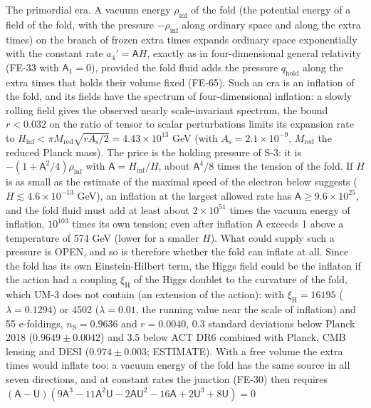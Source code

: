 \documentclass[
  10pt,
]{article}
\begin{document}
The primordial era. A vacuum energy \(\rho_{\mathrm{inf}}\) of the fold
(the potential energy of a field of the fold, with the pressure
\(-\rho_{\mathrm{inf}}\) along ordinary space and along the extra times)
on the branch of frozen extra times expands ordinary space exponentially
with the constant rate \(a_4' = \mathsf{A}H\), exactly as in
four-dimensional general relativity (FE-33 with \(\mathsf{A}_1 = 0\)),
provided the fold fluid adds the pressure \(q_{\mathrm{hold}}\) along
the extra times that holds their volume fixed (FE-65). Such an era is an
inflation of the fold, and its fields have the spectrum of
four-dimensional inflation: a slowly rolling field gives the observed
nearly scale-invariant spectrum, the bound \(r < 0.032\) on the ratio of
tensor to scalar perturbations limits its expansion rate to
\(H_{\mathrm{inf}} < \pi M_{\mathrm{red}}\sqrt{rA_{\mathrm{s}}/2} = 4.43\times10^{13}\)
GeV (with \(A_{\mathrm{s}} = 2.1\times10^{-9}\), \(M_{\mathrm{red}}\)
the reduced Planck mass). The price is the holding pressure of S-3: it
is \(-(1 + \mathsf{A}^2/4)\rho_{\mathrm{inf}}\) with
\(\mathsf{A} = H_{\mathrm{inf}}/H\), about \(\mathsf{A}^4/8\) times the
tension of the fold. If \(H\) is as small as the estimate of the maximal
speed of the electron below suggests (\(H \lesssim 4.6\times10^{-13}\)
GeV), an inflation at the largest allowed rate has
\(\mathsf{A} \ge 9.6\times10^{25}\), and the fold fluid must add at
least about \(2\times10^{51}\) times the vacuum energy of inflation,
\(10^{103}\) times its own tension; even after inflation \(\mathsf{A}\)
exceeds 1 above a temperature of 574 GeV (lower for a smaller \(H\)).
What could supply such a pressure is OPEN, and so is therefore whether
the fold can inflate at all. Since the fold has its own Einstein-Hilbert
term, the Higgs field could be the inflaton if the action had a coupling
\(\xi_{\mathrm{H}}\) of the Higgs doublet to the curvature of the fold,
which UM-3 does not contain (an extension of the action): with
\(\xi_{\mathrm{H}} = 16195\) (\(\lambda = 0.1294\)) or 4502
(\(\lambda = 0.01\), the running value near the scale of inflation) and
55 e-foldings, \(n_{\mathrm{S}} = 0.9636\) and \(r = 0.0040\), \(0.3\)
standard deviations below Planck 2018 (\(0.9649 \pm 0.0042\)) and 3.5
below ACT DR6 combined with Planck, CMB lensing and DESI
(\(0.974 \pm 0.003\); ESTIMATE). With a free volume the extra times
would inflate too: a vacuum energy of the fold has the same source in
all seven directions, and at constant rates the junction (FE-30) then
requires
\((\mathsf{A} - \mathsf{U})(9\mathsf{A}^3 - 11\mathsf{A}^2\mathsf{U} - 2\mathsf{A}\mathsf{U}^2 - 16\mathsf{A} + 2\mathsf{U}^3 + 8\mathsf{U}) = 0\)
\end{document}
